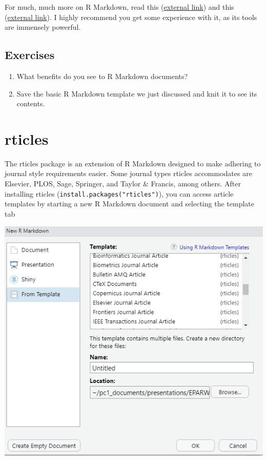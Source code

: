 \documentclass[
]{book}
\begin{document}
For much, much more on R Markdown, read this (\href{https://bookdown.org/yihui/rmarkdown/}{external link}) and this (\href{https://bookdown.org/yihui/rmarkdown-cookbook/}{external link}). I highly recommend you get some experience with it, as its tools are immensely powerful.

\hypertarget{ex-set12}{%
\subsection{Exercises}\label{ex-set12}}

\begin{enumerate}
\def\labelenumi{\arabic{enumi}.}
\item
  What benefits do you see to R Markdown documents?
\item
  Save the basic R Markdown template we just discussed and knit it to see its contents.
\end{enumerate}

\hypertarget{rticles}{%
\section{rticles}\label{rticles}}

The rticles package is an extension of R Markdown designed to make adhering to journal style requirements easier. Some journal types rticles accommodates are Elsevier, PLOS, Sage, Springer, and Taylor \& Francis, among others. After installing rticles (\texttt{install.packages("rticles")}), you can access article templates by starting a new R Markdown document and selecting the template tab

\includegraphics[width=1\linewidth]{images/rmark2}
\end{document}
